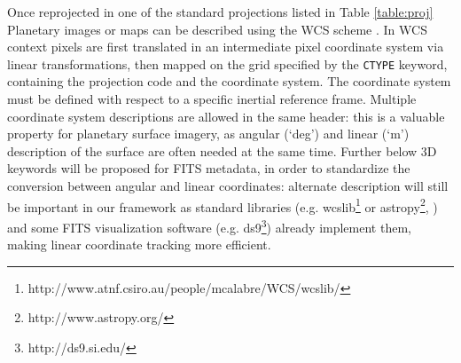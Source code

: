 Once reprojected in one of the standard projections listed in Table \ref{table:proj}
Planetary images or maps can be described using the WCS scheme
\citep{greisencalaII,calagreisenI}.
In WCS context pixels are first translated in an intermediate pixel coordinate system
via linear transformations, then mapped on the grid specified by the \texttt{CTYPE}
keyword, containing the projection code and the coordinate system.
The coordinate system must be defined with respect to a specific inertial reference frame.
Multiple coordinate system descriptions are allowed in the same header: this is a
valuable property for planetary surface imagery, as angular (`deg') and linear (`m')
description of the surface are often needed at the same time.
Further below 3D keywords will be proposed for FITS metadata, in order to standardize
the conversion between angular and linear coordinates: alternate description will still
be important in our framework as standard libraries (e.g.
wcslib\footnote{http://www.atnf.csiro.au/people/mcalabre/WCS/wcslib/} or
astropy\footnote{http://www.astropy.org/}, \citet{astropy}) and some FITS visualization
software (e.g. ds9\footnote{http://ds9.si.edu/}) already implement them, making linear
coordinate tracking more efficient.  

